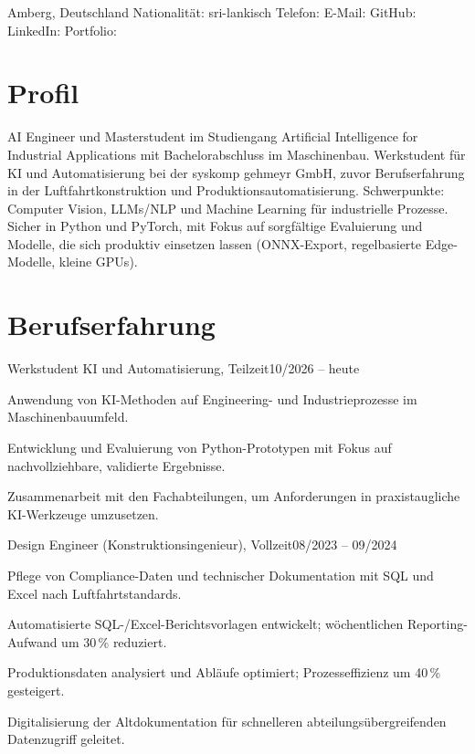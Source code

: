 \documentclass[a4paper,10pt]{article}
\begin{document}
\cvheader
  {Amberg, Deutschland \cvsep Nationalität: sri-lankisch \cvsep Telefon: \mbox{\cvphone}}
  {E-Mail: \mbox{\href{mailto:\cvemail}{\cvemail}} \cvsep GitHub: \mbox{\href{https://\cvgithub}{\cvgithub}}}
  {LinkedIn: \mbox{\href{https://www.\cvlinkedin}{\cvlinkedin}}}
  {Portfolio: \mbox{\href{https://\cvportfolio/}{\cvportfolio}}}

\section{Profil}
{\small
AI Engineer und Masterstudent im Studiengang Artificial Intelligence for Industrial Applications mit Bachelorabschluss
im Maschinenbau. Werkstudent für KI und Automatisierung bei der syskomp gehmeyr GmbH, zuvor Berufserfahrung in der
Luftfahrtkonstruktion und Produktionsautomatisierung. Schwerpunkte: Computer Vision, LLMs/NLP und Machine Learning
für industrielle Prozesse. Sicher in Python und PyTorch, mit Fokus auf sorgfältige Evaluierung und Modelle, die sich
produktiv einsetzen lassen (ONNX-Export, regelbasierte Edge-Modelle, kleine GPUs).
}

\section{Berufserfahrung}
\cvliststart

          {Werkstudent KI und Automatisierung, Teilzeit}{10/2026 -- heute}
  \cvpointsstart
    \item Anwendung von KI-Methoden auf Engineering- und Industrieprozesse im Maschinenbauumfeld.
    \item Entwicklung und Evaluierung von Python-Prototypen mit Fokus auf nachvollziehbare, validierte Ergebnisse.
    \item Zusammenarbeit mit den Fachabteilungen, um Anforderungen in praxistaugliche KI-Werkzeuge umzusetzen.
  \cvpointsend

          {Design Engineer (Konstruktionsingenieur), Vollzeit}{08/2023 -- 09/2024}
  \cvpointsstart
    \item Pflege von Compliance-Daten und technischer Dokumentation mit SQL und Excel nach Luftfahrtstandards.
    \item Automatisierte SQL-/Excel-Berichtsvorlagen entwickelt; wöchentlichen Reporting-Aufwand um 30\,\% reduziert.
    \item Produktionsdaten analysiert und Abläufe optimiert; Prozesseffizienz um 40\,\% gesteigert.
    \item Digitalisierung der Altdokumentation für schnelleren abteilungsübergreifenden Datenzugriff geleitet.
  \cvpointsend
\end{document}
